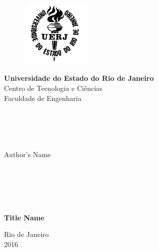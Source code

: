 \begin{titlepage}
\begin{center}

	\vspace{-0.5cm}

  \begin{figure}[hbt!]
		\begin{flushleft}
		   \includegraphics[width=3.44cm,height=3.17cm]{logos/logo_uerj_bw}
		\end{flushleft}
	\end{figure}
	\vspace{-4cm}

  \hspace{2cm}\large{\textbf{Universidade do Estado do Rio de Janeiro}}\\
  \hspace{2cm}\large{Centro de Tecnologia e Ciências}\\
  \hspace{2cm}\large{Faculdade de Engenharia}\\

  \hspace{2cm}\large{}\\
  \hspace{2cm}\large{}\\
  \hspace{2cm}\large{}\\
  \hspace{2cm}\large{}\\

  \par
  \Large{Author's Name}

  \hspace{2cm}\large{}\\
  \hspace{2cm}\large{}\\
  \hspace{2cm}\large{}\\
  \hspace{2cm}\large{}\\


  \par
  \textbf{\LARGE Title Name }


  \par\vfill
  {\large Rio de Janeiro\\2016}

\end{center}
\end{titlepage}